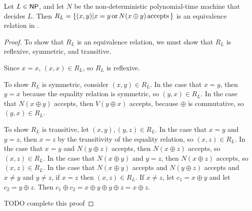 \begin{lemma}\label{lem:rl_eq_rel}Let $L\in{\ensuremath{\mathsf{NP}}}$, and let $N$ be the
  non-deterministic polynomial-time machine that decides $L$.  Then
  $R_L=\{(x,y)|x=y \,\text{or}\, N(x\oplus y) \,\text{accepts}\,\}$ is an equivalence
  relation in \NPEq.\end{lemma}
\begin{proof}To show that $R_L$ is an equivalence relation, we must show that
  $R_L$ is reflexive, symmetric, and transitive.
  
  Since $x=x$, $(x,x)\in R_L$, so $R_L$ is reflexive.

  To show $R_L$ is symmetric, consider $(x,y)\in R_L$. In the case that $x=y$,
  then $y=x$ because the equality relation is symmetric, so $(y,x)\in R_L$. In
  the case that $N(x\oplus y)$ accepts, then $V(y\oplus x)$ accepts, because
  $\oplus$ is commutative, so $(y,x)\in R_L$.

  To show $R_L$ is transitive, let $(x,y),(y,z)\in R_L$. In the case that $x=y$
  and $y=z$, then $x=z$ by the transitivity of the equality relation, so
  $(x,z)\in R_L$. In the case that $x=y$ and $N(y\oplus z)$ accepts, then
  $N(x\oplus z)$ accepts, so $(x,z)\in R_L$. In the case that $N( x\oplus y)$
  and $y=z$, then $N(x\oplus z)$ accepts, so $(x,z)\in R_L$. In the case that
  $N(x\oplus y)$ accepts and $N(y\oplus z)$ accepts and $x\neq y$ and $y\neq
  z$, if $x=z$ then $(x,z)\in R_L$. If $x\neq z$, let $c_1=x\oplus y$ and let
  $c_2=y\oplus z$. Then $c_1\oplus c_2=x\oplus y\oplus y\oplus z=x\oplus z$.

  TODO complete this proof
\end{proof}

  


